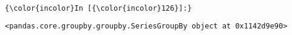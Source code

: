 \documentclass[11pt]{article}
\begin{document}
    \begin{center}
    \end{center}
    { \hspace*{\fill} \\}
    
    \begin{Verbatim}[commandchars=\\\{\}]
{\color{incolor}In [{\color{incolor}126}]:} 
\end{Verbatim}


    \begin{Verbatim}[commandchars=\\\{\}]
<pandas.core.groupby.groupby.SeriesGroupBy object at 0x1142d9e90>

    \end{Verbatim}


    
    
    
    
\end{document}
